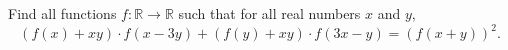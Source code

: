 Find all functions $f:\mathbb{R}\rightarrow \mathbb{R}$ such that for all real numbers $x$ and $y$, $$(f(x)+xy)\cdot f(x-3y)+(f(y)+xy)\cdot f(3x-y)=(f(x+y))^2.$$